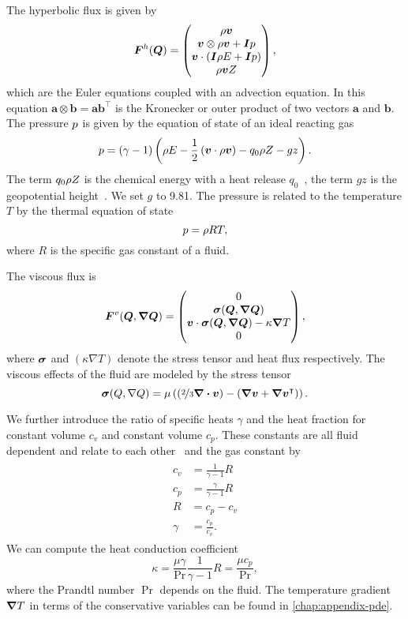 The hyperbolic flux is given by
\begin{equation}
  \label{eq:hyper-flux}
  \bm{F}^{h}(\bm{Q}) = \begin{pmatrix} \rho \bm{v} \\ \bm{v} \otimes \rho \bm{v} + \bm{I} p \\ \bm{v} \cdot (\bm{I} \rho E + \bm{I} p) \\ \rho \bm{v} Z \end{pmatrix},
\end{equation}
which are the Euler equations coupled with an advection equation.
In this equation $\bm{a} \otimes \bm{b} = \bm{a} \bm{b}^\intercal$ is the Kronecker or outer product of two vectors $\bm{a}$ and $\bm{b}$.
The pressure $p$ is given by the equation of state of an ideal reacting gas
\begin{equation}
  \label{eq:eos}
  p = (\gamma - 1) \left(\rho E - \frac{1}{2} \left(\bm{v} \cdot \rho \bm{v} \right)  - q_0 \rho Z - gz \right).
\end{equation}
The term $q_0 \rho Z$ is the chemical energy with a heat release $q_0$~\cite{helzel2000modified}, the term $gz$ is the geopotential height~\cite{giraldo2008study}.
We set $g$ to 9.81.
The pressure is related to the temperature $T$ by the thermal equation of state
\begin{equation}
  \label{eq:temperature}
  p = \rho R T,
\end{equation}
where $R$ is the specific gas constant of a fluid.

The viscous flux is
\begin{equation}
  \label{eq:visc-flux}
  \viscFlux(\Q, \gradQ) = \viscFluxDef,
\end{equation}
where $\bm{\sigma}$ and $(\kappa \nabla T)$ denote the stress tensor and heat flux respectively.
The viscous effects of the fluid are modeled by the stress tensor
\begin{equation}
  \label{eq:stress-tensor}
  \stressT(Q, \nabla Q) =
  \mu
  \left(
  \left(\nicefrac{2}{3} \divergence{\Qv} \right) -
  \left( \gradient{\Qv} + \gradient{\Qv}^\intercal \right)
  \right).
\end{equation}

We further introduce the ratio of specific heats $\gamma$ and the heat fraction for constant volume $c_v$ and constant volume $c_p$.
These constants are all fluid dependent and relate to each other~\cite{dumbser2010arbitrary} and the gas constant by
\begin{align}
  \label{eq:fluid-constants}
  \begin{split}
  c_v &= \frac{1}{\gamma - 1} R \\
  c_p &= \frac{\gamma}{\gamma - 1} R\\
  R &= c_p - c_v\\
  \gamma &= \frac{c_p}{c_v}.
  \end{split}
\end{align}
We can compute the heat conduction coefficient
\begin{equation}
  \label{eq:heat-conduction-coeff}
  \kappa = \frac{\mu \gamma}{\Pr} \frac{1}{\gamma - 1} R = \frac{\mu c_p}{\Pr},
\end{equation}
where the Prandtl number $\Pr$ depends on the fluid.
The temperature gradient $\gradient{T}$ in terms of the conservative variables can be found in \cref{chap:appendix-pde}.

